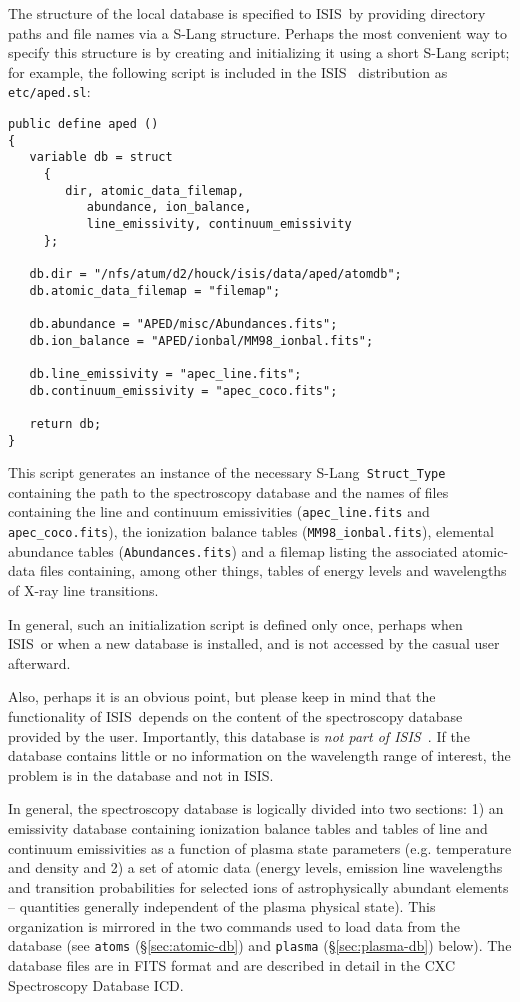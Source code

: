 \documentclass{book}
\newcommand{\isisx}{{\sc ISIS~}}
\newcommand{\isis}{{\sc ISIS}}
\newcommand{\slang}{{\sc S-Lang}}
\begin{document}
{The structure of the local database is specified to \isisx by
providing directory paths and file names via a S-Lang structure.
Perhaps the most convenient way to specify this structure is by
creating and initializing it using a short S-Lang script; for
example, the following script is included in the \isisx
distribution as \verb|etc/aped.sl|:
\begin{verbatim}
public define aped ()
{
   variable db = struct
     {
        dir, atomic_data_filemap,
           abundance, ion_balance,
           line_emissivity, continuum_emissivity
     };

   db.dir = "/nfs/atum/d2/houck/isis/data/aped/atomdb";
   db.atomic_data_filemap = "filemap";

   db.abundance = "APED/misc/Abundances.fits";
   db.ion_balance = "APED/ionbal/MM98_ionbal.fits";

   db.line_emissivity = "apec_line.fits";
   db.continuum_emissivity = "apec_coco.fits";

   return db;
}
\end{verbatim}
This script generates an instance of the necessary \slang {\tt
Struct\_Type} containing the path to the spectroscopy database and
the names of files containing the line and continuum emissivities
({\tt apec\_line.fits} and {\tt apec\_coco.fits}), the
ionization balance tables ({\tt MM98\_ionbal.fits}), elemental
abundance tables ({\tt Abundances.fits}) and a filemap listing the
associated atomic-data files containing, among other things,
tables of energy levels and wavelengths of X-ray line transitions.

In general, such an initialization script is defined only once,
perhaps when \isisx or when a new database is
installed, and is not accessed by the casual user afterward.

Also, perhaps it is an obvious point, but please keep in mind that the
functionality of \isisx depends on the content of the spectroscopy database
provided by the user.  Importantly, this database is {\it not part of
\isisx}. If the database contains little or no information on the wavelength
range of interest, the problem is in the database and not in \isis.

In general, the spectroscopy database is logically divided into two
sections: 1) an emissivity database containing ionization balance tables and
tables of line and continuum emissivities as a function of plasma state
parameters (e.g. temperature and density and 2) a set of atomic data (energy
levels, emission line wavelengths and transition probabilities for selected
ions of astrophysically abundant elements -- quantities generally
independent of the plasma physical state).  This organization is mirrored in
the two commands used to load data from the database (see {\tt atoms}
(\S\ref{sec:atomic-db}) and {\tt plasma} (\S \ref{sec:plasma-db}) below).
The database files are in FITS format and are described in detail in the CXC
Spectroscopy Database ICD.

}
\end{document}

